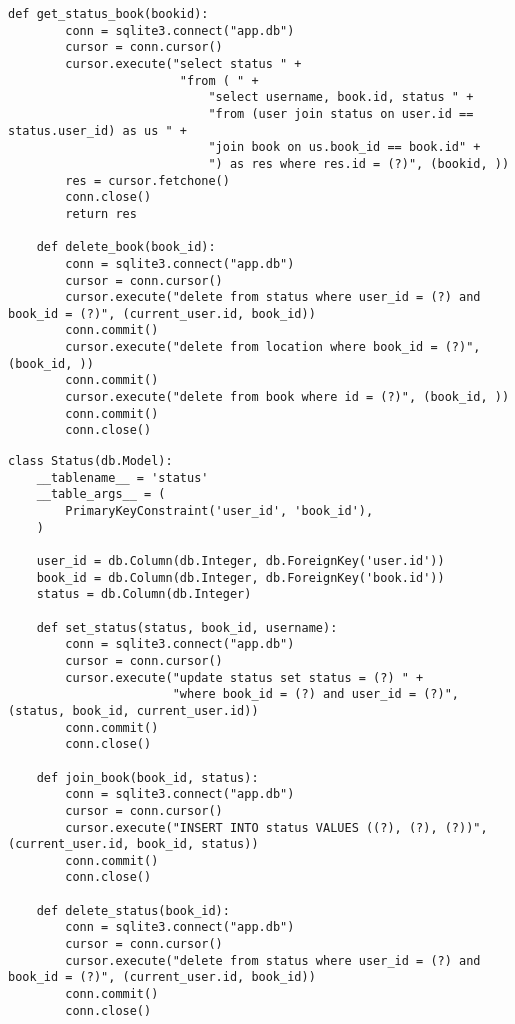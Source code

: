 \begin{lstlisting}[label=some-code, caption=Класс <<Книги>>]
    def get_status_book(bookid):
        conn = sqlite3.connect("app.db")
        cursor = conn.cursor()
        cursor.execute("select status " +
                        "from ( " +
                            "select username, book.id, status " +
                            "from (user join status on user.id == status.user_id) as us " +
                            "join book on us.book_id == book.id" +
                            ") as res where res.id = (?)", (bookid, ))
        res = cursor.fetchone()
        conn.close()
        return res

    def delete_book(book_id):
        conn = sqlite3.connect("app.db")
        cursor = conn.cursor()
        cursor.execute("delete from status where user_id = (?) and book_id = (?)", (current_user.id, book_id))
        conn.commit()
        cursor.execute("delete from location where book_id = (?)", (book_id, ))
        conn.commit()
        cursor.execute("delete from book where id = (?)", (book_id, ))
        conn.commit()
        conn.close()
\end{lstlisting}

\begin{lstlisting}[label=some-code, caption=Класс <<Статус>>]
class Status(db.Model):
    __tablename__ = 'status'
    __table_args__ = (
        PrimaryKeyConstraint('user_id', 'book_id'),
    )

    user_id = db.Column(db.Integer, db.ForeignKey('user.id'))
    book_id = db.Column(db.Integer, db.ForeignKey('book.id'))
    status = db.Column(db.Integer)

    def set_status(status, book_id, username):
        conn = sqlite3.connect("app.db")
        cursor = conn.cursor()
        cursor.execute("update status set status = (?) " +
                       "where book_id = (?) and user_id = (?)", (status, book_id, current_user.id))
        conn.commit()
        conn.close()

    def join_book(book_id, status):
        conn = sqlite3.connect("app.db")
        cursor = conn.cursor()
        cursor.execute("INSERT INTO status VALUES ((?), (?), (?))", (current_user.id, book_id, status))
        conn.commit()
        conn.close()

    def delete_status(book_id):
        conn = sqlite3.connect("app.db")
        cursor = conn.cursor()
        cursor.execute("delete from status where user_id = (?) and book_id = (?)", (current_user.id, book_id))
        conn.commit()
        conn.close()

\end{lstlisting}

